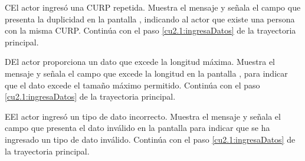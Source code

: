  \begin{UCtrayectoriaA}{C}{El actor ingresó una CURP repetida.}
    \UCpaso[\UCsist] Muestra el mensaje  y señala el campo que presenta la duplicidad en la pantalla 
	    , indicando al actor que existe una persona con la misma CURP.
    \UCpaso[] Continúa con el paso \ref{cu2.1:ingresaDatos} de la trayectoria principal.
 \end{UCtrayectoriaA}
 
 \begin{UCtrayectoriaA}{D}{El actor proporciona un dato que excede la longitud máxima.}
    \UCpaso[\UCsist] Muestra el mensaje  y señala el campo que excede la 
    longitud en la pantalla , para indicar que el dato excede el tamaño máximo permitido.
    \UCpaso[] Continúa con el paso \ref{cu2.1:ingresaDatos} de la trayectoria principal.
 \end{UCtrayectoriaA}
 
 \begin{UCtrayectoriaA}{E}{El actor ingresó un tipo de dato incorrecto.}
    \UCpaso[\UCsist] Muestra el mensaje  y señala el campo que presenta el dato inválido en la 
    pantalla  para indicar que se ha ingresado un tipo de dato inválido.
    \UCpaso[] Continúa con el paso \ref{cu2.1:ingresaDatos} de la trayectoria principal.
 \end{UCtrayectoriaA}
 